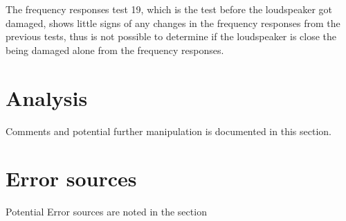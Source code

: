 The frequency responses test 19, which is the test before the loudspeaker got damaged, shows little signs of any changes in the frequency responses from the previous tests, thus is not possible to determine if the loudspeaker is close the being damaged alone from the frequency responses.










\section{Analysis}

Comments and potential further manipulation is documented in this section. 

\section{Error sources}

Potential Error sources are noted in the section

